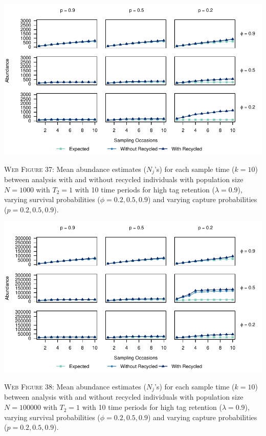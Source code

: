 \documentclass[]{article}
\begin{document}
\includegraphics{Appendix_files/figure-latex/37_abundance_H_GJSTL1-1.pdf}

\textsc{Web Figure 37:} Mean abundance estimates (\(N_j\)'s) for each
sample time (\(k=10\)) between analysis with and without recycled
individuals with population size \(N=1000\) with \(T_2=1\) with 10 time
periods for high tag retention (\(\lambda=0.9\)), varying survival
probabilities (\(\phi=0.2,0.5,0.9\)) and varying capture probabilities
(\(p=0.2,0.5,0.9\)).

\includegraphics{Appendix_files/figure-latex/38_abundance_H_GJSTL2-1.pdf}

\textsc{Web Figure 38:} Mean abundance estimates (\(N_j\)'s) for each
sample time (\(k=10\)) between analysis with and without recycled
individuals with population size \(N=100000\) with \(T_2=1\) with 10
time periods for high tag retention (\(\lambda=0.9\)), varying survival
probabilities (\(\phi=0.2,0.5,0.9\)) and varying capture probabilities
(\(p=0.2,0.5,0.9\)).

\newpage
\end{document}
